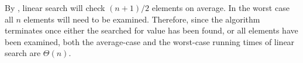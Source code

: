By , linear search will check $(n+1)/2$ elements on average.
In the worst case all $n$ elements will need to be examined.
Therefore, since the algorithm terminates once either the searched for value has been found, or all elements have been examined, both the average-case and the worst-case running times of linear search are $\Theta(n)$.
